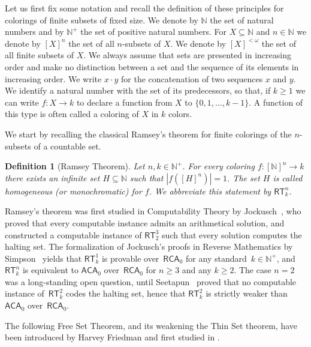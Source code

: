 \documentclass{article}
\newcommand{\RCA}[0]{\mathsf{RCA}}
\newcommand{\ACA}[0]{\mathsf{ACA}}
\newcommand{\RT}[0]{\mathsf{RT}}
\newcommand{\NN}[0]{\mathbb{N}}
\numberwithin{theorem}{section}
\newtheorem{definition}[theorem]{Definition}
\newcommand{\ludovic}[1]{\textcolor{blue}{#1}}
\begin{document}
Let us first fix some notation and recall the definition of these principles for colorings of finite subsets of fixed size. We denote by $\NN$ the set of natural numbers and by $\NN^+$ the set of positive natural numbers. For $X\subseteq \NN$ and $n \in \NN$
we denote by $[X]^{n}$ the set of all $n$-subsets of $X$. We denote by $[X]^{<\omega}$ the set of all finite subsets of $X$. We always assume that sets are presented in increasing order and make no distinction between a set and the sequence of its elements in increasing order. We write $x \cdot y$ for the concatenation of two sequences $x$ and $y$. We identify a natural number with the set of its predecessors, so that, if $k\geq 1$ we can write $f: X \to k$ to declare a function from $X$ to $\{0, 1, \dots, k-1\}$. A function of this type is often called a coloring of $X$ in $k$ colors.

We start by recalling the classical Ramsey's theorem for finite colorings of the $n$-subsets of a countable set. 

\begin{definition}[Ramsey Theorem] Let $n, k\in \NN^+$.  
For every coloring $f:[\NN]^{n} \to k$ there exists an infinite set $H\subseteq \NN$ such that $|f([H]^n)| = 1$. The set $H$ is called homogeneous (or monochromatic) for $f$.
We abbreviate this statement by $\RT^n_k$.
\end{definition}

Ramsey's theorem was first studied in Computability Theory by Jockusch~\cite{JockuschRamsey_1972}, who proved that every computable instance admits an arithmetical solution, and constructed a computable instance of $\RT^3_2$ such that every solution computes the halting set. The formalization of Jockusch's proofs in Reverse Mathematics by Simpson~\cite{SIM:SOSOA} yields that $\RT^1_k$ is provable over~$\RCA_0$ for any standard~$k \in \NN^+$, and $\RT^n_k$ is equivalent to $\ACA_0$ over~$\RCA_0$ for $n \geq 3$ and any $k\geq 2$. The case $n = 2$ was a long-standing open question, until Seetapun~\cite{seetapun1995strength} proved that no computable instance of~$\RT^2_k$ codes the halting set, hence that $\RT^2_k$ is strictly weaker than $\ACA_0$ over~$\RCA_0$.

The following Free Set Theorem, and its weakening the Thin Set theorem, have been introduced by Harvey Friedman \cite{Fri-Sim:00} and first studied in \cite{Cholak_Giusto_Hirst_Jockusch_2005}.
\end{document}
